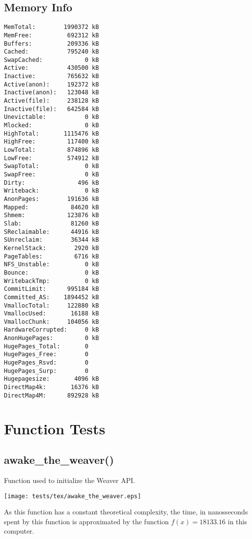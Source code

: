 \documentclass{article}
\begin{document}
\subsection{Memory Info}
\begin{verbatim}
MemTotal:        1990372 kB
MemFree:          692312 kB
Buffers:          209336 kB
Cached:           795240 kB
SwapCached:            0 kB
Active:           430500 kB
Inactive:         765632 kB
Active(anon):     192372 kB
Inactive(anon):   123048 kB
Active(file):     238128 kB
Inactive(file):   642584 kB
Unevictable:           0 kB
Mlocked:               0 kB
HighTotal:       1115476 kB
HighFree:         117400 kB
LowTotal:         874896 kB
LowFree:          574912 kB
SwapTotal:             0 kB
SwapFree:              0 kB
Dirty:               496 kB
Writeback:             0 kB
AnonPages:        191636 kB
Mapped:            84620 kB
Shmem:            123876 kB
Slab:              81260 kB
SReclaimable:      44916 kB
SUnreclaim:        36344 kB
KernelStack:        2920 kB
PageTables:         6716 kB
NFS_Unstable:          0 kB
Bounce:                0 kB
WritebackTmp:          0 kB
CommitLimit:      995184 kB
Committed_AS:    1894452 kB
VmallocTotal:     122880 kB
VmallocUsed:       16188 kB
VmallocChunk:     104056 kB
HardwareCorrupted:     0 kB
AnonHugePages:         0 kB
HugePages_Total:       0
HugePages_Free:        0
HugePages_Rsvd:        0
HugePages_Surp:        0
Hugepagesize:       4096 kB
DirectMap4k:       16376 kB
DirectMap4M:      892928 kB
\end{verbatim}
\section{Function Tests}
\subsection{awake\_the\_weaver()}
Function used to initialize the Weaver API.

\texttt{[image: tests/tex/awake\_the\_weaver.eps]}

As this function has a constant theoretical
complexity, the time, in nanosseconds spent 
by this function is 
approximated by the function $f(x)=18133.16$
in this computer.
\end{document}
